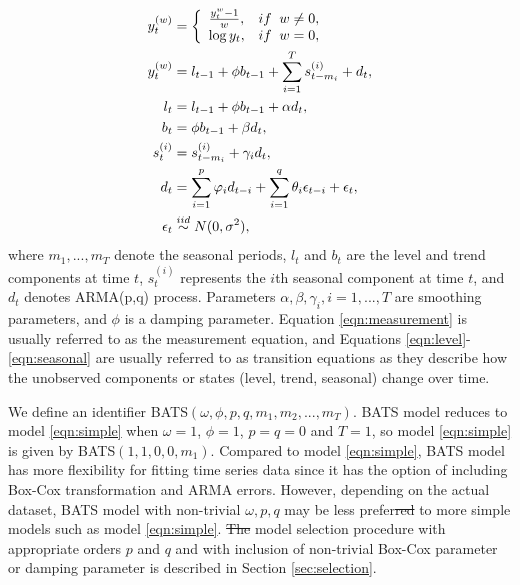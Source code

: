 \documentclass{uwstat572}
\newcommand{\vmdel}[1]{\sout{#1}}
\newcommand{\vmadd}[1]{\textbf{\color{red}{#1}}}
\begin{document}
\begin{subequations}
\begin{align}
y_t^{  (w)} &= \left\{
\begin{array}{l l}
\frac{y_t^{w}-1}{w}, & if \;\; w \neq 0,\\
\log y_t, & if\;\; w=0,\\
\end{array} \right. \\
y_t^{ (w)} &= l_{t-1}+\phi b_{t-1} +\sum\limits_{i=1}^T s_{t-m_i}^{(i)}+d_t, \label{eqn:measurement} \\
l_t &= l_{t-1}+\phi b_{t-1}+\alpha d_t,\label{eqn:level}  \\
 b_t &= \phi b_{t-1}+\beta d_t, \label{eqn:trend} \\
 s_t^{(i)} &= s_{t-m_i}^{(i)}+\gamma_i d_t, \label{eqn:seasonal} \\
 d_t &= \sum\limits_{i=1}^p \varphi_id_{t-i} +\sum\limits_{i=1}^q \theta_i \epsilon_{t-i}+\epsilon_t, \\
 \epsilon_t &  \stackrel{iid}{\sim} N(0,\sigma^2),
\end{align}
\end{subequations}
\noindent where $m_1,..., m_T$ denote the seasonal periods, $l_t$ and $b_t$ are the level and trend components at time $t$, $s_t^{(i)}$ represents the $i$th seasonal component at time $t$, and $d_t$ denotes ARMA(p,q) process. 
Parameters $\alpha, \beta, \gamma_i, i=1,...,T$ are smoothing parameters, and $\phi$ is a damping parameter. Equation \eqref{eqn:measurement} is usually referred to as the measurement equation, and Equations \eqref{eqn:level}-\eqref{eqn:seasonal} are usually referred to as transition equations as they describe how the unobserved components or states (level, trend, seasonal) change over time. 

We define an identifier BATS$( \omega, \phi, p, q, m_1, m_2, ..., m_T )$. BATS model reduces to model \vmadd{defined by Equations} \eqref{eqn:simple} when $\omega=1$, $\phi=1$, $p=q=0$ and $T=1$, so \vmadd{the} model \vmadd{in} \eqref{eqn:simple} is given by BATS$(1,1,0,0, m_1)$. 
Compared to model \vmadd{defined by Equations} \eqref{eqn:simple}, BATS model has more flexibility for fitting time series data since it has the option of including \vmadd{a} Box-Cox transformation and ARMA errors. 
However, depending on the actual dataset, \vmadd{the} BATS model with non-trivial $\omega, p, q$ may be less prefer\vmadd{able}\vmdel{red} \vmadd{compared} to more simple models\vmadd{,} such as \vmadd{the} model \eqref{eqn:simple}. 
\vmdel{The} \vmadd{A} model selection procedure\vmadd{, proposed by \citet{de2011forecasting},} with appropriate orders $p$ and $q$ and with inclusion of non-trivial Box-Cox parameter or damping parameter is described in Section \ref{sec:selection}. 
\end{document}
